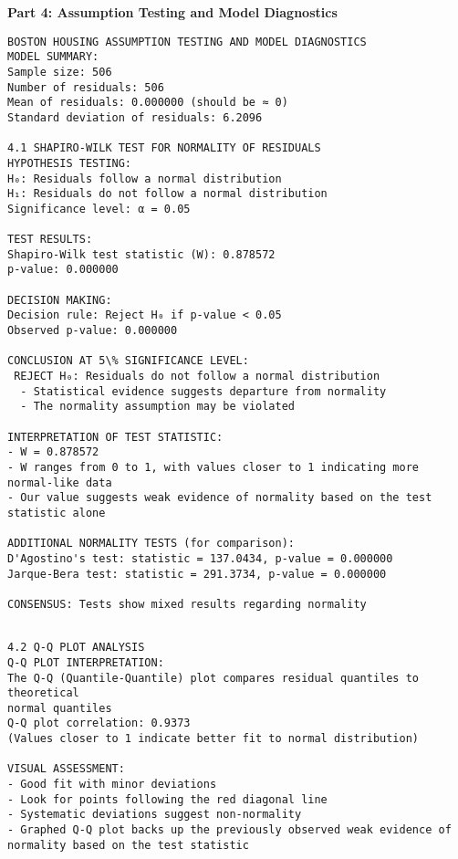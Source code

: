 \documentclass[8pt, twocolumn]{extarticle}
\begin{document}
    \textbf{Part 4: Assumption Testing and Model Diagnostics}

    \begin{Verbatim}[commandchars=\\\{\}]
BOSTON HOUSING ASSUMPTION TESTING AND MODEL DIAGNOSTICS
MODEL SUMMARY:
Sample size: 506
Number of residuals: 506
Mean of residuals: 0.000000 (should be ≈ 0)
Standard deviation of residuals: 6.2096

4.1 SHAPIRO-WILK TEST FOR NORMALITY OF RESIDUALS
HYPOTHESIS TESTING:
H₀: Residuals follow a normal distribution
H₁: Residuals do not follow a normal distribution
Significance level: α = 0.05

TEST RESULTS:
Shapiro-Wilk test statistic (W): 0.878572
p-value: 0.000000

DECISION MAKING:
Decision rule: Reject H₀ if p-value < 0.05
Observed p-value: 0.000000

CONCLUSION AT 5\% SIGNIFICANCE LEVEL:
 REJECT H₀: Residuals do not follow a normal distribution
  - Statistical evidence suggests departure from normality
  - The normality assumption may be violated

INTERPRETATION OF TEST STATISTIC:
- W = 0.878572
- W ranges from 0 to 1, with values closer to 1 indicating more normal-like data
- Our value suggests weak evidence of normality based on the test statistic alone

ADDITIONAL NORMALITY TESTS (for comparison):
D'Agostino's test: statistic = 137.0434, p-value = 0.000000
Jarque-Bera test: statistic = 291.3734, p-value = 0.000000

CONSENSUS: Tests show mixed results regarding normality
    \end{Verbatim}


    \begin{Verbatim}[commandchars=\\\{\}]

4.2 Q-Q PLOT ANALYSIS
Q-Q PLOT INTERPRETATION:
The Q-Q (Quantile-Quantile) plot compares residual quantiles to theoretical
normal quantiles
Q-Q plot correlation: 0.9373
(Values closer to 1 indicate better fit to normal distribution)

VISUAL ASSESSMENT:
- Good fit with minor deviations
- Look for points following the red diagonal line
- Systematic deviations suggest non-normality
- Graphed Q-Q plot backs up the previously observed weak evidence of normality based on the test statistic
    \end{Verbatim}
\end{document}
